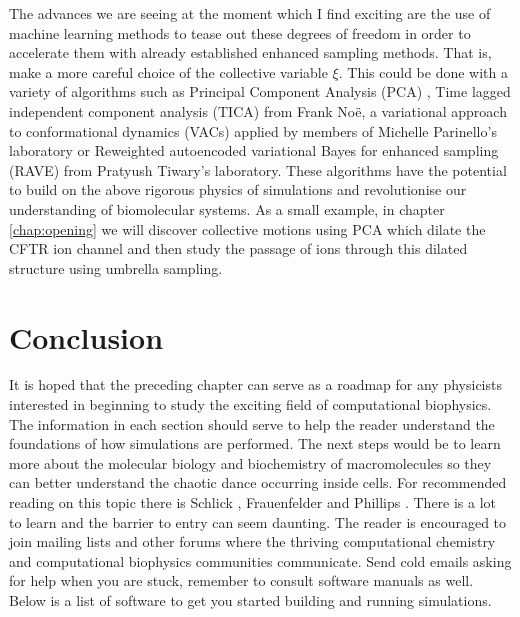 The advances we are seeing at the moment which I find exciting are the use of machine learning methods to tease out these degrees of freedom in order to accelerate them with already established enhanced sampling methods. That is, make a more careful choice of the collective variable $\xi$. This could be done with a variety of algorithms such as Principal Component Analysis (PCA) \cite{spiwok2007}, Time lagged independent component analysis (TICA) \cite{noe2001, schultze2021} from Frank No\"e, a variational approach to conformational dynamics (VACs) applied by members of Michelle Parinello's laboratory \cite{brotzakis2019} or Reweighted autoencoded variational Bayes for enhanced sampling (RAVE) \cite{ribeiro2018} from Pratyush Tiwary's laboratory. These algorithms have the potential to build on the above rigorous physics of simulations and revolutionise our understanding of biomolecular systems. As a small example, in chapter \ref{chap:opening} we will discover collective motions using PCA which dilate the CFTR ion channel and then study the passage of ions through this dilated structure using umbrella sampling. 

\section{Conclusion}
It is hoped that the preceding chapter can serve as a roadmap for any physicists interested in beginning to study the exciting field of computational biophysics. The information in each section should serve to help the reader understand the foundations of how simulations are performed. The next steps would be to learn more about the molecular biology and biochemistry of macromolecules so they can better understand the chaotic dance occurring inside cells. For recommended reading on this topic there is Schlick \cite{schlick2010}, Frauenfelder \cite{frauenfelder2010} and Phillips \cite{phillips2012}. There is a lot to learn and the barrier to entry can seem daunting. The reader is encouraged to join mailing lists and other forums where the thriving computational chemistry and computational biophysics communities communicate. Send cold emails asking for help when you are stuck, remember to consult software manuals as well. Below is a list of software to get you started building and running simulations. 

